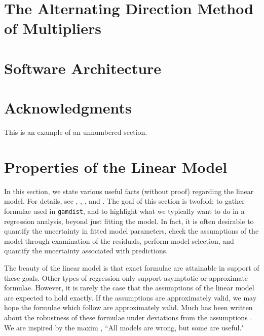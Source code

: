 \documentclass[12pt]{article}
\newcommand{\gamdist}{\texttt{gamdist}}
\begin{document}
\section{The Alternating Direction Method of Multipliers}
\label{sec:admm}

\section{Software Architecture}
\label{sec:arch}

\section*{Acknowledgments}

This is an example of an unnumbered section.

\appendix

\section{Properties of the Linear Model}
\label{app:linear_model}

In this section, we state various useful facts (without proof) regarding the linear model. For details, see \cite{Weisberg:2005}, \cite{Seber:2003}, \cite{Wood:2017}, and \cite{CB:2001}. The goal of this section is twofold: to gather formulae used in \gamdist{}, and to highlight what we typically want to do in a regression analysis, beyond just fitting the model. In fact, it is often desirable to quantify the uncertainty in fitted model parameters, check the assumptions of the model through examination of the residuals, perform model selection, and quantify the uncertainty associated with predictions.

The beauty of the linear model is that exact formulae are attainable in support of these goals. Other types of regression only support asymptotic or approximate formulae. However, it is rarely the case that the assumptions of the linear model are expected to hold exactly. If the assumptions are approximately valid, we may hope the formulae which follow are approximately valid. Much has been written about the robustness of these formulae under deviations from the assumptions \cite[\S 9]{Seber:2003}. We are inspired by the maxim \cite{Box:1987}, ``All models are wrong, but some are useful."
\end{document}
